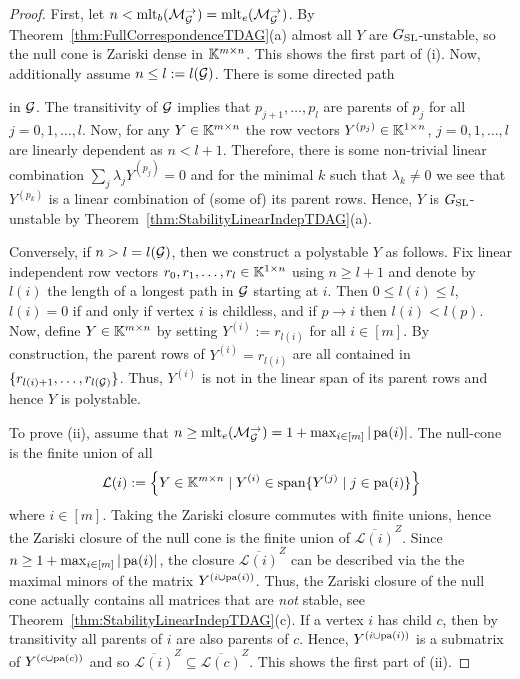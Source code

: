 \begin{proof}
		First, let $n < \operatorname{mlt}_b(\mathcal{M}_{\mathcal{G}}^{\to}) = \operatorname{mlt}_e(\mathcal{M}_{\mathcal{G}}^{\to})$. By Theorem~\ref{thm:FullCorrespondenceTDAG}(a) almost all $Y$ are $G_{\operatorname{SL}}$-unstable, so the null cone is Zariski dense in $\mathbb K^{m \times n}$. This shows the first part of (i). Now, additionally assume $n \leq l := l(\mathcal{G})$. There is some directed path
			\begin{center}
			\end{center}
		in $\mathcal{G}$. The transitivity of $\mathcal{G}$ implies that $p_{j+1}, \ldots, p_l$ are parents of $p_j$ for all $j = 0,1,\ldots,l$. Now, for any $Y \in \mathbb K^{m \times n}$ the row vectors $Y^{(p_j)} \in \mathbb K^{1 \times n}$, $j =0,1,\ldots,l$ are linearly dependent as $n < l + 1$. Therefore, there is some non-trivial linear combination $\sum_j \lambda_j Y^{(p_j)} = 0$ and for the minimal $k$ such that $\lambda_k \neq 0$ we see that $Y^{(p_k)}$ is a linear combination of (some of) its parent rows. Hence, $Y$ is $G_{\operatorname{SL}}$-unstable by Theorem~\ref{thm:StabilityLinearIndepTDAG}(a).
		
		Conversely, if $n > l = l(\mathcal{G})$, then we construct a polystable $Y$ as follows. Fix linear independent row vectors $r_0, r_1, \ldots, r_l \in \mathbb K^{1 \times n}$ using $n \geq l+1$ and denote by $l(i)$ the length of a longest path in $\mathcal{G}$ starting at $i$. Then $0 \leq l(i) \leq l$, $l(i) = 0$ if and only if vertex $i$ is childless, and if $p \to i$ then $l(i) < l(p)$. Now, define $Y \in \mathbb K^{m \times n}$ by setting $Y^{(i)} := r_{l(i)}$ for all $i \in [m]$. By construction, the parent rows of $Y^{(i)} = r_{l(i)}$ are all contained in $\{ r_{l(i) +1}, \ldots, r_{l(\mathcal{G})}\}$. Thus, $Y^{(i)}$ is not in the linear span of its parent rows and hence $Y$ is polystable.
		
		To prove (ii), assume that $n \geq \operatorname{mlt}_e(\mathcal{M}_{\mathcal{G}}^{\to}) = 1 + \max_{i \in [m]} | \operatorname{pa}(i) |$. The null-cone is the finite union of all
			\[ \mathcal{L}(i) := \left\lbrace Y \in \mathbb K^{m \times n} \mid Y^{(i)} \in \operatorname{span} \{Y^{(j)} \mid j \in \operatorname{pa}(i)\} \right\rbrace \]
		where $i \in [m]$. Taking the Zariski closure commutes with finite unions, hence the Zariski closure of the null cone is the finite union of $\overline{\mathcal{L}(i)}^{Z}$. Since $n \geq 1 + \max_{i \in [m]} | \operatorname{pa}(i) |$, the closure $\overline{\mathcal{L}(i)}^{Z}$ can be described via the the maximal minors of the matrix $Y^{(i \cup \operatorname{pa}(i))}$. %
		Thus, the Zariski closure of the null cone actually contains all matrices that are \emph{not} stable, see Theorem~\ref{thm:StabilityLinearIndepTDAG}(c).
		If a vertex $i$ has child $c$, then by transitivity all parents of $i$ are also parents of $c$. Hence, $Y^{(i \cup \operatorname{pa}(i))}$ is a submatrix of $Y^{(c \cup \operatorname{pa}(c))}$ and so $\overline{\mathcal{L}(i)}^{Z} \subseteq \overline{\mathcal{L}(c)}^{Z}$. This shows the first part of (ii).
		

\end{proof}
